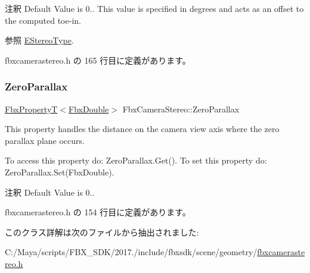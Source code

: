 \begin{DoxyRemark}{注釈}
Default Value is 0.. This value is specified in degrees and acts as an offset to the computed toe-\/in. 
\end{DoxyRemark}
\begin{DoxySeeAlso}{参照}
\hyperlink{class_fbx_camera_stereo_acb0f27675a73de0858983b703196cb37}{E\+Stereo\+Type}. 
\end{DoxySeeAlso}


 fbxcamerastereo.\+h の 165 行目に定義があります。

\mbox{\label{class_fbx_camera_stereo_ab76f0822d4543864dfe707ea8b3be50a}} 
\subsubsection{\texorpdfstring{Zero\+Parallax}{ZeroParallax}}
{\footnotesize\ttfamily \hyperlink{class_fbx_property_t}{Fbx\+PropertyT}$<$\hyperlink{fbxtypes_8h_a171e72a1c46fc15c1a6c9c31948c1c5b}{Fbx\+Double}$>$ Fbx\+Camera\+Stereo\+::\+Zero\+Parallax}

This property handles the distance on the camera view axis where the zero parallax plane occurs.

To access this property do\+: Zero\+Parallax.\+Get(). To set this property do\+: Zero\+Parallax.\+Set(\+Fbx\+Double).

\begin{DoxyRemark}{注釈}
Default Value is 0.. 
\end{DoxyRemark}


 fbxcamerastereo.\+h の 154 行目に定義があります。



このクラス詳解は次のファイルから抽出されました\+:\begin{DoxyCompactItemize}
\item 
C\+:/\+Maya/scripts/\+F\+B\+X\+\_\+\+S\+D\+K/2017./include/fbxsdk/scene/geometry/\hyperlink{fbxcamerastereo_8h}{fbxcamerastereo.\+h}\end{DoxyCompactItemize}
